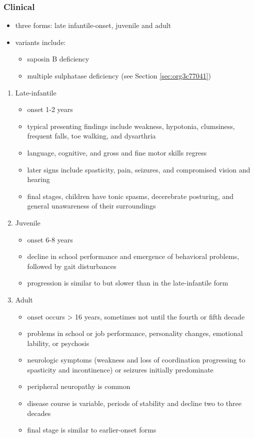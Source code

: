 \documentclass[12pt]{scrartcl}
\begin{document}
\subsubsection{Clinical}
\label{sec:org8003ca6}
\begin{itemize}
\item three forms: late infantile-onset, juvenile and adult
\item variants include:
\begin{itemize}
\item saposin B deficiency
\item multiple sulphatase deficiency (see Section \ref{sec:org3c77041})
\end{itemize}
\end{itemize}
\begin{enumerate}
\item Late-infantile
\label{sec:orgaa81456}
\begin{itemize}
\item onset 1-2 years
\item typical presenting findings include weakness, hypotonia, clumsiness, frequent falls, toe walking, and dysarthria
\item language, cognitive, and gross and fine motor skills regress
\item later signs include spasticity, pain, seizures, and compromised vision and hearing
\item final stages, children have tonic spasms, decerebrate posturing, and
general unawareness of their surroundings
\end{itemize}

\item Juvenile
\label{sec:org2cc79df}
\begin{itemize}
\item onset 6-8 years
\item decline in school performance and emergence of behavioral problems, followed by gait disturbances
\item progression is similar to but slower than in the late-infantile form
\end{itemize}

\item Adult
\label{sec:org53ed41c}
\begin{itemize}
\item onset occurs \textgreater{} 16 years, sometimes not until the fourth or fifth decade
\item problems in school or job performance, personality changes, emotional lability, or psychosis
\item neurologic symptoms (weakness and loss of coordination progressing
to spasticity and incontinence) or seizures initially
predominate
\item peripheral neuropathy is common
\item disease course is variable, periods of stability and decline two to three decades
\item final stage is similar to earlier-onset forms
\end{itemize}
\end{enumerate}
\end{document}
